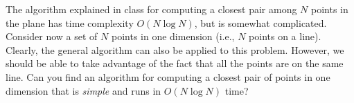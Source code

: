 The algorithm explained in class for computing a closest pair among $N$
points in the plane has time complexity $O(N \log  N)$, but is somewhat
complicated.  Consider now a set of $N$ points in one dimension (i.e.,
$N$ points on a line).  Clearly, the general algorithm can also be
applied to this problem.  However, we should be able to take advantage
of the fact that all the points are on the same line.  Can you find an
algorithm for computing a closest pair of points in one dimension that
is {\em simple} and runs in $O(N \log  N)$ time?
